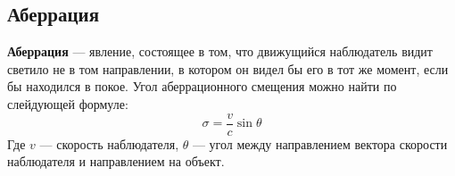 \subsection{Аберрация}

\textbf{Аберрация} --- явление, состоящее в том, что движущийся наблюдатель видит светило не в том направлении, в котором он видел бы его в тот же момент, если бы находился в покое. 
Угол аберрационного смещения можно найти по слейдующей формуле:
\begin{equation}\sigma=\frac{v}{c}\sin\theta
\end{equation}
Где $v$ --- скорость наблюдателя, $\theta$ --- угол между направлением вектора скорости наблюдателя и направлением на объект.
